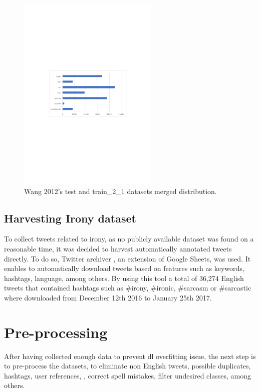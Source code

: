\begin{figure}[!htp]
  \center
  \includegraphics[width=0.6\textwidth]{figures/wang_2012_dataset_distribution}
  \caption{Wang 2012's test and train\_2\_1 datasets merged distribution.}
  \label{fig:wang_2012_dataset_distribution}
\end{figure}

\subsection{Harvesting Irony dataset}

To collect tweets related to irony, as no publicly available dataset was found on a reasonable time, it was decided to harvest automatically annotated tweets directly. To do so, Twitter archiver \cite{twitterArchiver}, an extension of Google Sheets, was used. It enables to automatically download tweets based on features such as keywords, hashtags, language, among others. By using this tool a total of 36,274 English tweets that contained hashtags such as \#irony, \#ironic, \#sarcasm or \#sarcastic where downloaded from December 12th 2016 to January 25th 2017.

\section{Pre-processing}
\label{sec:solution_prepocessing}

After having collected enough data to prevent \acrshort{dl} overfitting issue, the next step is to pre-process the datasets, to eliminate non English tweets, possible duplicates, hashtags, user references, , correct spell mistakes, filter undesired classes, among others.

